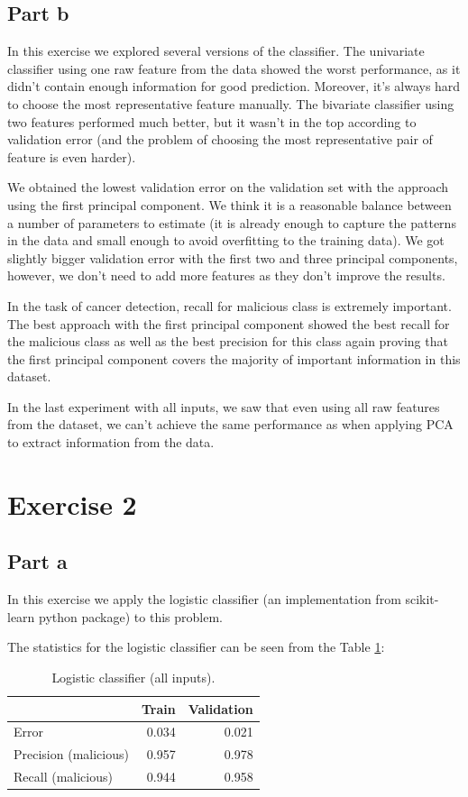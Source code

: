 \documentclass[11pt,a4paper]{article}
\begin{document}
\subsection*{Part b}
In this exercise we explored several versions of the classifier. The univariate classifier using one raw feature from the data showed the worst performance, as it didn't contain enough information for good prediction. Moreover, it's always hard to choose the most representative feature manually. The bivariate classifier using two features performed much better, but it wasn't in the top according to validation error (and the problem of choosing the most representative pair of feature is even harder).

We obtained the lowest validation error on the validation set with the approach using the first principal component. We think it is a reasonable balance between a number of parameters to estimate (it is already enough to capture the patterns in the data and small enough to avoid overfitting to the training data). We got slightly bigger validation error with the first two and three principal components, however, we don't need to add more features as they don't improve the results.

In the task of cancer detection, recall for malicious class is extremely important. The best approach with the first principal component showed the best recall for the malicious class as well as the best precision for this class again proving that the first principal component covers the majority of important information in this dataset.

In the last experiment with all inputs, we saw that even using all raw features from the dataset, we can't achieve the same performance as when applying PCA to extract information from the data.

\section{Exercise 2}
\subsection{Part a}

In this exercise we apply the logistic classifier (an implementation from scikit-learn python package) to this problem. 
 
The statistics for the logistic classifier can be seen from the Table \ref{tab:results-log}:

\begin{table}[H]
	\centering
	\begin{tabular}{lrr}
		\toprule
		& \textbf{Train} & \textbf{Validation}  \\ \midrule
		Error & 0.034 & 0.021 \\	
		Precision (malicious) & 0.957 & 0.978 \\
		Recall (malicious) & 0.944 & 0.958 \\
		\bottomrule
	\end{tabular}
	\caption{Logistic classifier (all inputs).}
	\label{tab:results-log}
\end{table}
\end{document}
